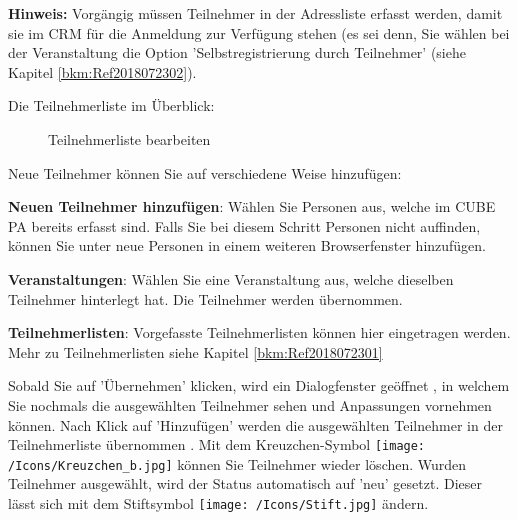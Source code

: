 \textbf{Hinweis:} Vorgängig müssen Teilnehmer in der Adressliste erfasst werden, damit sie im CRM für die Anmeldung zur Verfügung stehen (es sei denn, Sie wählen bei der Veranstaltung die Option 'Selbstregistrierung durch Teilnehmer' (siehe Kapitel \ref{bkm:Ref2018072302}).

\vspace{\baselineskip}

Die Teilnehmerliste im Überblick:

\begin{figure}[H]
\caption{Teilnehmerliste bearbeiten}
\end{figure}

Neue Teilnehmer können Sie auf verschiedene Weise hinzufügen:
\begin{compactitem}
	\item \textbf{Neuen Teilnehmer hinzufügen}: Wählen Sie Personen aus, welche im CUBE PA bereits erfasst sind. Falls Sie bei diesem Schritt Personen nicht auffinden, können Sie unter  neue Personen in einem weiteren Browserfenster hinzufügen.
	\item \textbf{Veranstaltungen}: Wählen Sie eine Veranstaltung aus, welche dieselben Teilnehmer hinterlegt hat. Die Teilnehmer werden übernommen.
	\item \textbf{Teilnehmerlisten}: Vorgefasste Teilnehmerlisten können hier eingetragen werden. Mehr zu Teilnehmerlisten siehe Kapitel \ref{bkm:Ref2018072301}
\end{compactitem}
Sobald Sie auf 'Übernehmen'  klicken, wird ein Dialogfenster geöffnet , in welchem Sie nochmals die ausgewählten Teilnehmer sehen und Anpassungen vornehmen können. Nach Klick auf 'Hinzufügen' werden die ausgewählten Teilnehmer in der Teilnehmerliste übernommen . Mit dem Kreuzchen-Symbol \texttt{[image: /Icons/Kreuzchen\_b.jpg]}  können Sie Teilnehmer wieder löschen. Wurden Teilnehmer ausgewählt, wird der Status automatisch auf 'neu' gesetzt. Dieser lässt sich mit dem Stiftsymbol \texttt{[image: /Icons/Stift.jpg]} ändern.\\

